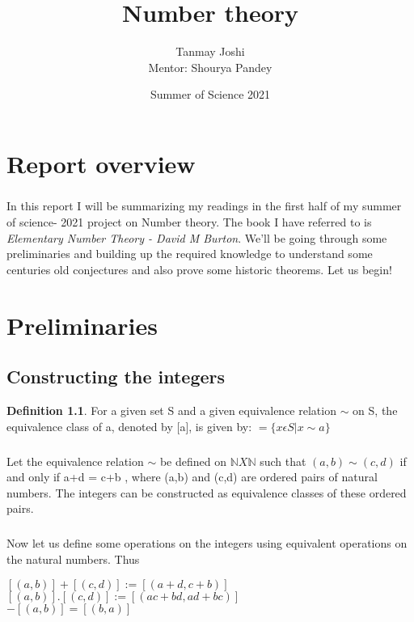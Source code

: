 \documentclass[15,a4paper]{report}
\title{\textbf{\Huge{Number theory}}}
\author{\Large{Tanmay Joshi} \\
\Large{Mentor: Shourya Pandey}}
\date{Summer of Science 2021}
\theoremstyle{definition}
\newtheorem{definition}{Definition}[section]
\theoremstyle{remark}
\begin{document}
\maketitle



\tableofcontents


\chapter*{Report overview}

\paragraph{}In this report I will be summarizing my readings in the first half of my summer of science- 2021 project on Number theory. The book I have referred to is  \textit{Elementary Number Theory - David M Burton}. We'll be going through some preliminaries and building up the required knowledge to understand some centuries old conjectures and also prove some historic theorems. Let us begin!


\chapter{Preliminaries}



\section{Constructing the integers}
\begin{definition}
    For a given set S and a given equivalence relation $\mathtt{\sim}$ on S, the equivalence class of a, denoted by [a], is given by: 
    \begin{math}
        [a] = \{ x \epsilon S | x \mathtt{\sim} a \}
    \end{math}
\end{definition}

\paragraph{} Let the equivalence relation $\mathtt{\sim}$ be defined on $\mathbb{N} X \mathbb{N}$ such that $(a,b)\mathtt{\sim} (c,d) $ if and only if a+d = c+b , where (a,b) and (c,d) are ordered pairs of natural numbers. The integers can be constructed as equivalence classes of these ordered pairs.

\paragraph{} Now let us define some operations on the integers using equivalent operations on the natural numbers. 
Thus
\begin{center}
        $[(a,b)] + [(c,d)] := [(a+d,c+b)]$ \\
        $[(a,b)].[(c,d)]:= [(ac+bd,ad+bc)]$\\
        $-[(a,b)]=[(b,a)]$
\end{center}
\end{document}

